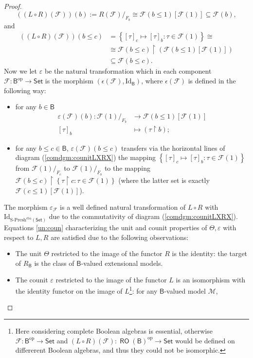\documentclass[11pt]{amsart}
\newcommand{\F}{\mathcal{F}}
\newcommand{\Id}{\textrm{Id}}
\newcommand{\SPresh}{\textrm{S-Presh}}
\theoremstyle{plain}
\theoremstyle{definition}
\theoremstyle{plain}
\theoremstyle{remark}
\newcommand{\M}{\mathcal{M}}
\newcommand{\dSet}{\mathsf{Set}}
\DeclareMathOperator{\RO}{\mathsf{RO}}
\newcommand{\bool}[1]{\mathsf{#1}}
\newcommand{\bp}[1]{\left\lbrace #1 \right\rbrace}
\newcommand{\0}{\mathsf{0}}
\renewcommand{\1}{\mathsf{1}}
\renewcommand{\2}{\mathsf{2}}
\theoremstyle{definition}
\begin{document}
\begin{proof}
\begin{equation}\label{eqn:LXCIRCRX0}
((L\circ R)(\F))(b):=R(\F)/_{F_b}\cong \F(b\leq 1)[\F(1)]\subseteq\F(b),
\end{equation}
and
\begin{align}\label{eqn:LXCIRCRX1}
((L\circ R)(\F))(b\leq c)&=
\bp{[\tau]_{c}\mapsto [\tau]_{b}: \tau \in \F(1)}\cong\\ \nonumber
&\cong \F(b\leq c)\restriction (\F(b\leq 1)[\F(1)])\\ \nonumber
&\subseteq \F(b\leq c).
\end{align}
Now we let $\varepsilon$ be the natural transformation which in each component $\F:\bool{B}^{\textrm{op}}\to\dSet$ is the morphism $(\epsilon(\F), \Id_{\bool{B}})$, where $\epsilon(\F)$ is defined in the following way:
\begin{itemize}
\item for any $b\in\bool{B}$
\begin{align*}
\varepsilon(\F)(b):\F(1)/_{F_b}&\to\F(b\leq 1)[\F(1)]\\
 [\tau]_b&\mapsto(\tau\restriction b);
\end{align*} 
\item for any $b\leq c\in\bool{B}$,
$\varepsilon(\F)(b\leq c)$ transfers via the horizontal lines of diagram (\ref{comdgm:counitLXRX})
the mapping $\bp{[\tau]_c\mapsto[\tau]_b:\tau\in \F(1)}$ from $\F(1)/_{F_c}$ to $\F(1)/_{F_b}$ to the mapping $\F(b\leq c)\restriction \bp{\tau\restriction c: \tau\in \F(1)}$ (where the latter set is exactly $\F(c\leq 1)[\F(1)]$).
\end{itemize}
The morphism $\varepsilon_\F$ is a well defined natural transformation of $L\circ R$ with 
$\Id_{\SPresh^{\textrm{cba}}(\dSet)}$ due to the commutativity of diagram (\ref{comdgm:counitLXRX}).\\ 
Equations \eqref{un:coun} characterizing the unit and counit properties of $\Theta,\varepsilon$ with respect to $L,R$ 
are satisfied due to the following observations:
\begin{itemize}
\item 
The unit $\Theta$ restricted to the image of the functor $R$ is the identity: 
the target of $R_\bool{B}$ is the class of $\bool{B}$-valued extensional models. 
\item
The counit $\varepsilon$ restricted to the image of the functor 
$L$ is an isomorphism with the identity functor on the image of $L$\footnote{Here considering complete Boolean algebras is essential, otherwise $\F:\bool{B}^{\textrm{op}}\to\dSet$ and $(L\circ R)(\F):\RO(\bool{B})^{\textrm{op}}\to\dSet$ would be defined on differerent Boolean algebras, and thus they could not be isomorphic.}: for any $\bool{B}$-valued model $\M$,

\end{itemize}
\end{proof}
\end{document}
